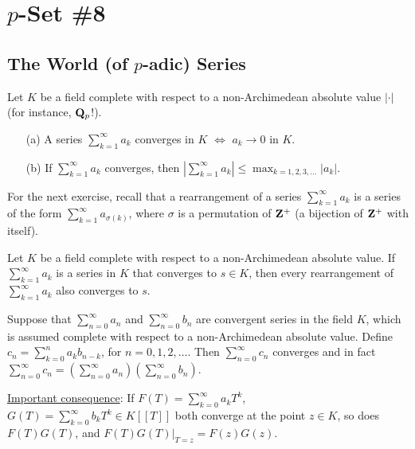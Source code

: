 \chapter*{$p$-Set \#8}


\section*{The World (of $p$-adic) Series}


\begin{prob}\label{ex:seriesconvergence}\label{prob:89} Let $K$ be a field complete with respect to a non-Archimedean absolute value $|\cdot|$ (for instance, $\mathbf{Q}_p$!). 
\begin{enumerate}\vspace{-0.05in}
    \item[(a)] A series $\sum_{k=1}^{\infty} a_k$ converges in $K$ $\Longleftrightarrow$ $a_k \to 0$ in $K$. 
    \item[(b)] If $\sum_{k=1}^{\infty} a_k$ converges, then $\left|\sum_{k=1}^{\infty} a_k\right| \le \max_{k=1,2,3,\dots} |a_k|$.
\end{enumerate}
\end{prob}

For the next exercise, recall that a \textsf{rearrangement} of a series $\sum_{k=1}^{\infty} a_k$ is a series of the form $\sum_{k=1}^{\infty} a_{\sigma(k)}$, where $\sigma$ is a permutation of $\mathbf{Z}^{+}$ (a bijection of $\mathbf{Z}^{+}$ with itself).

\begin{prob}\label{prob:90} Let $K$ be a field complete with respect to a non-Archimedean absolute value. If $\sum_{k=1}^{\infty} a_k$ is a series in $K$ that converges to $s\in K$, then every rearrangement of $\sum_{k=1}^{\infty} a_k$ also converges to $s$.
\end{prob}


\begin{prob}\label{prob:93} Suppose that $\sum_{n=0}^{\infty} a_n$ and $\sum_{n=0}^{\infty} b_n$ are convergent series in the field $K$, which is assumed complete with respect to a non-Archimedean absolute value. Define $c_n = \sum_{k=0}^{n} a_k b_{n-k}$, for $n=0,1,2,\dots$. Then $\sum_{n=0}^{\infty} c_n$ converges and in fact $\sum_{n=0}^{\infty} c_n = (\sum_{n=0}^{\infty} a_n) (\sum_{n=0}^{\infty} b_n)$.

{\scriptsize \underline{Important consequence}: If $F(T) = \sum_{k=0}^{\infty} a_k T^k$,  $G(T) = \sum_{k=0}^{\infty} b_k T^k \in K[[T]]$ both converge at the point $z \in K$, so does $F(T)G(T)$, and $F(T)G(T)|_{T=z} = F(z) G(z)$. }
\end{prob}






